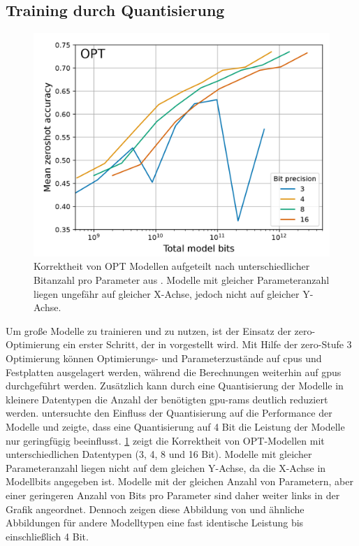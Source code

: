 \subsection{Training durch Quantisierung}
\begin{figure}
    \centering
    \includegraphics[width=\textwidth]{results/bit_scaling_laws.png}
    \caption[Korrektheit von OPT Modellen nach Modellbits]{Korrektheit von OPT Modellen aufgeteilt nach unterschiedlicher Bitanzahl pro Parameter aus \citet{4bit}. Modelle mit gleicher Parameteranzahl liegen ungefähr auf gleicher X-Achse, jedoch nicht auf gleicher Y-Achse.}%
    \label{fig:bit_scaling}
\end{figure}
Um große Modelle zu trainieren und zu nutzen, ist der Einsatz der \ac{zero}-Optimierung ein erster Schritt, der in \citet{deepspeed} vorgestellt wird.
Mit Hilfe der \ac{zero}-Stufe 3 Optimierung können Optimierungs- und Parameterzustände auf \ac{cpu}s und Festplatten ausgelagert werden, während die Berechnungen weiterhin auf \ac{gpu}s durchgeführt werden.
Zusätzlich kann durch eine Quantisierung der Modelle in kleinere Datentypen die Anzahl der benötigten \ac{gpu}-\ac{ram}s deutlich reduziert werden.
\citet{4bit} untersuchte den Einfluss der Quantisierung auf die Performance der Modelle und zeigte, dass eine Quantisierung auf 4 Bit die Leistung der Modelle nur geringfügig beeinflusst.
\cref{fig:bit_scaling} zeigt die Korrektheit von OPT-Modellen mit unterschiedlichen Datentypen (3, 4, 8 und 16 Bit).
Modelle mit gleicher Parameteranzahl liegen nicht auf dem gleichen Y-Achse, da die X-Achse in Modellbits angegeben ist.
Modelle mit der gleichen Anzahl von Parametern, aber einer geringeren Anzahl von Bits pro Parameter sind daher weiter links in der Grafik angeordnet.
Dennoch zeigen diese Abbildung von \citet{4bit} und ähnliche Abbildungen für andere Modelltypen eine fast identische Leistung bis einschließlich 4 Bit.\\

